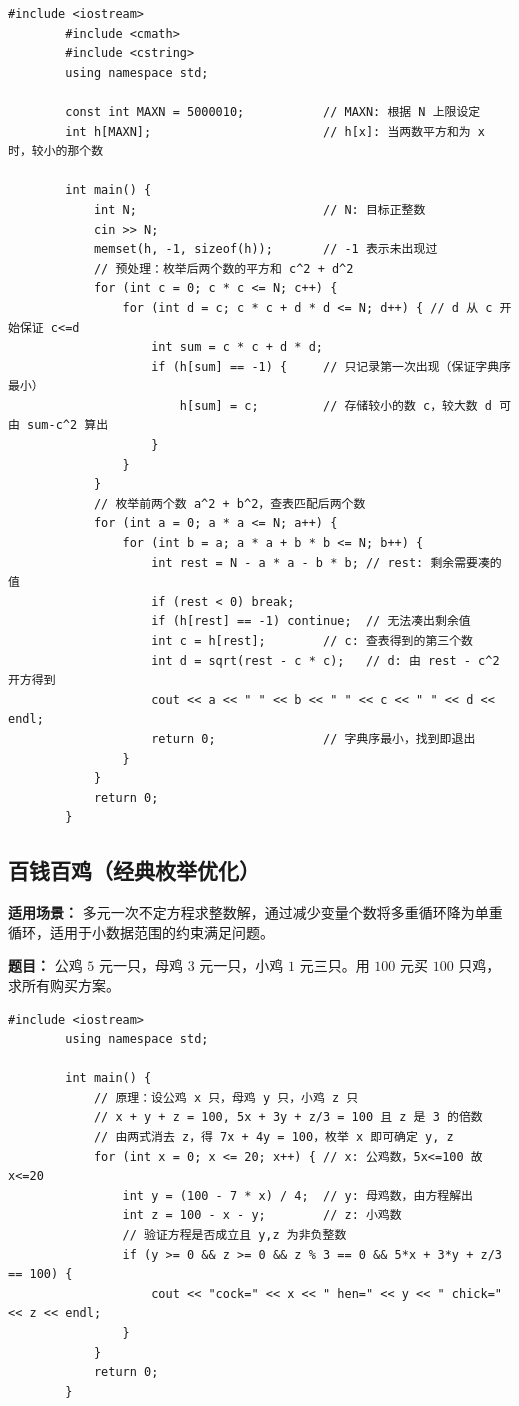 \documentclass[12pt,a4paper]{ctexart}
\begin{document}
	\begin{lstlisting}[caption={四平方和——枚举前两项 + 哈希查表}]
		#include <iostream>
		#include <cmath>
		#include <cstring>
		using namespace std;
		
		const int MAXN = 5000010;           // MAXN: 根据 N 上限设定
		int h[MAXN];                        // h[x]: 当两数平方和为 x 时，较小的那个数
		
		int main() {
			int N;                          // N: 目标正整数
			cin >> N;
			memset(h, -1, sizeof(h));       // -1 表示未出现过
			// 预处理：枚举后两个数的平方和 c^2 + d^2
			for (int c = 0; c * c <= N; c++) {
				for (int d = c; c * c + d * d <= N; d++) { // d 从 c 开始保证 c<=d
					int sum = c * c + d * d;
					if (h[sum] == -1) {     // 只记录第一次出现（保证字典序最小）
						h[sum] = c;         // 存储较小的数 c，较大数 d 可由 sum-c^2 算出
					}
				}
			}
			// 枚举前两个数 a^2 + b^2，查表匹配后两个数
			for (int a = 0; a * a <= N; a++) {
				for (int b = a; a * a + b * b <= N; b++) {
					int rest = N - a * a - b * b; // rest: 剩余需要凑的值
					if (rest < 0) break;
					if (h[rest] == -1) continue;  // 无法凑出剩余值
					int c = h[rest];        // c: 查表得到的第三个数
					int d = sqrt(rest - c * c);   // d: 由 rest - c^2 开方得到
					cout << a << " " << b << " " << c << " " << d << endl;
					return 0;               // 字典序最小，找到即退出
				}
			}
			return 0;
		}
	\end{lstlisting}
	
	\subsection{百钱百鸡（经典枚举优化）}
	\textbf{适用场景：} 多元一次不定方程求整数解，通过减少变量个数将多重循环降为单重循环，适用于小数据范围的约束满足问题。
	
	\textbf{题目：} 公鸡 \(5\) 元一只，母鸡 \(3\) 元一只，小鸡 \(1\) 元三只。用 \(100\) 元买 \(100\) 只鸡，求所有购买方案。
	
	\begin{lstlisting}[caption={百钱百鸡——消元降维枚举}]
		#include <iostream>
		using namespace std;
		
		int main() {
			// 原理：设公鸡 x 只，母鸡 y 只，小鸡 z 只
			// x + y + z = 100, 5x + 3y + z/3 = 100 且 z 是 3 的倍数
			// 由两式消去 z，得 7x + 4y = 100，枚举 x 即可确定 y, z
			for (int x = 0; x <= 20; x++) { // x: 公鸡数，5x<=100 故 x<=20
				int y = (100 - 7 * x) / 4;  // y: 母鸡数，由方程解出
				int z = 100 - x - y;        // z: 小鸡数
				// 验证方程是否成立且 y,z 为非负整数
				if (y >= 0 && z >= 0 && z % 3 == 0 && 5*x + 3*y + z/3 == 100) {
					cout << "cock=" << x << " hen=" << y << " chick=" << z << endl;
				}
			}
			return 0;
		}
	\end{lstlisting}
	
\end{document}
